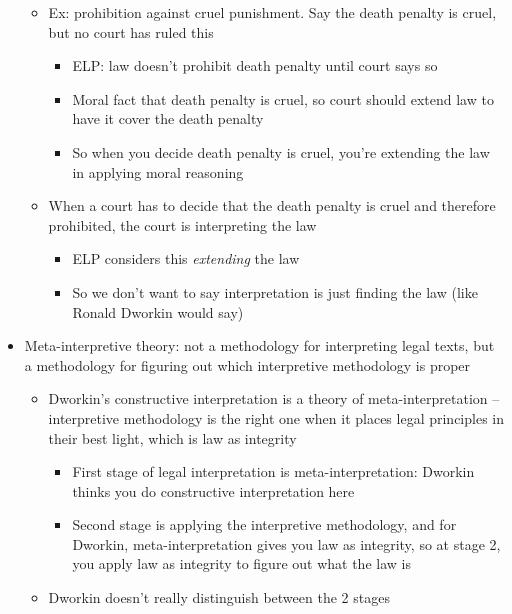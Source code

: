\begin{itemize}
  \begin{itemize}
  \tightlist
  \item
    Ex: prohibition against cruel punishment. Say the death penalty is
    cruel, but no court has ruled this

    \begin{itemize}
    \tightlist
    \item
      ELP: law doesn't prohibit death penalty until court says so
    \item
      Moral fact that death penalty is cruel, so court should extend law
      to have it cover the death penalty
    \item
      So when you decide death penalty is cruel, you're extending the
      law in applying moral reasoning
    \end{itemize}
  \item
    When a court has to decide that the death penalty is cruel and
    therefore prohibited, the court is interpreting the law

    \begin{itemize}
    \tightlist
    \item
      ELP considers this \emph{extending} the law
    \item
      So we don't want to say interpretation is just finding the law
      (like Ronald Dworkin would say)
    \end{itemize}
  \end{itemize}
\item
  Meta-interpretive theory: not a methodology for interpreting legal
  texts, but a methodology for figuring out which interpretive
  methodology is proper

  \begin{itemize}
  \tightlist
  \item
    Dworkin's constructive interpretation is a theory of
    meta-interpretation -- interpretive methodology is the right one
    when it places legal principles in their best light, which is law as
    integrity

    \begin{itemize}
    \tightlist
    \item
      First stage of legal interpretation is meta-interpretation:
      Dworkin thinks you do constructive interpretation here
    \item
      Second stage is applying the interpretive methodology, and for
      Dworkin, meta-interpretation gives you law as integrity, so at
      stage 2, you apply law as integrity to figure out what the law is
    \end{itemize}
  \item
    Dworkin doesn't really distinguish between the 2 stages
  \end{itemize}
\end{itemize}


